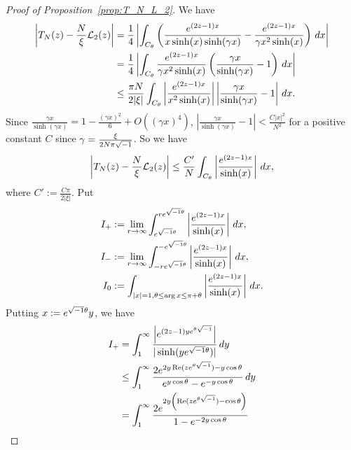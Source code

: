 \begin{proof}[Proof of Proposition~\ref{prop:T_N_L_2}]
We have
\begin{equation*}
\begin{split}
  \left|
    T_N(z)
    -
    \frac{N}{\xi}\mathcal{L}_2(z)
  \right|
  &=
  \frac{1}{4}
  \left|
    \int_{C_{\theta}}
    \left(
      \frac{e^{(2z-1)x}}{x\sinh(x)\sinh(\gamma x)}
      -
      \frac{e^{(2z-1)x}}{\gamma x^2\sinh(x)}
    \right)
    \,dx
  \right|
  \\
  &=
  \frac{1}{4}
  \left|
    \int_{C_{\theta}}
    \frac{e^{(2z-1)x}}{\gamma x^2\sinh(x)}
    \left(
      \frac{\gamma x}{\sinh(\gamma x)}-1
    \right)
    \,dx
  \right|
  \\
  &\le
  \frac{\pi N}{2|\xi|}
  \int_{C_{\theta}}
  \left|
    \frac{e^{(2z-1)x}}{x^2\sinh(x)}
  \right|
  \left|
    \frac{\gamma x}{\sinh(\gamma x)}-1
  \right|
  \,dx.
\end{split}
\end{equation*}
Since $\frac{\gamma x}{\sinh(\gamma x)}=1-\frac{(\gamma x)^2}{6}+O((\gamma x)^4)$, $\left|\frac{\gamma x}{\sinh(\gamma x)}-1\right|<\frac{C|x|^2}{N^2}$ for a positive constant $C$ since $\gamma=\frac{\xi}{2N\pi\sqrt{-1}}$.
So we have
\begin{equation*}
  \left|
    T_N(z)
    -
    \frac{N}{\xi}\mathcal{L}_2(z)
  \right|
  \le
  \frac{C'}{N}
  \int_{C_{\theta}}
  \left|\frac{e^{(2z-1)x}}{\sinh(x)}\right|\,dx,
\end{equation*}
where $C':=\frac{C\pi}{2|\xi|}$.
Put
\begin{align*}
  I_{+}
  &:=
  \lim_{r\to\infty}
  \int_{e^{\sqrt{-1}\theta}}^{re^{\sqrt{-1}\theta}}
  \left|\frac{e^{(2z-1)x}}{\sinh(x)}\right|\,dx,
  \\
  I_{-}
  &:=
  \lim_{r\to\infty}
  \int_{-re^{\sqrt{-1}\theta}}^{-e^{\sqrt{-1}\theta}}
  \left|\frac{e^{(2z-1)x}}{\sinh(x)}\right|\,dx,
  \\
  I_{0}
  &:=
  \int_{|x|=1,\theta\le\arg{x}\le\pi+\theta}
  \left|\frac{e^{(2z-1)x}}{\sinh(x)}\right|\,dx.
\end{align*}
Putting $x:=e^{\sqrt{-1}\theta}y$, we have
\begin{equation*}
\begin{split}
  I_{+}
  &=
  \int_{1}^{\infty}
  \frac{\left|e^{(2z-1)ye^{\theta\i}}\right|}{|\sinh(ye^{\i\theta})|}
  \,dy
  \\
  &\le
  \int_{1}^{\infty}
  \frac{2e^{2y\Re(ze^{\theta\i})-y\cos\theta}}{e^{y\cos\theta}-e^{-y\cos\theta}}
  \,dy
  \\
  &=
  \int_{1}^{\infty}
  \frac{2e^{2y\left(\Re(ze^{\theta\i})-\cos\theta\right)}}{1-e^{-2y\cos\theta}}

\end{split}
\end{equation*}
\end{proof}
